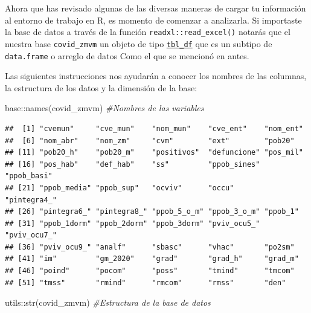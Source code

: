 \documentclass[
  11pt,
  oneside]{book}
\newenvironment{Shaded}{\begin{snugshade}}{\end{snugshade}}
\newcommand{\CommentTok}[1]{\textcolor[rgb]{0.56,0.35,0.01}{\textit{#1}}}
\newcommand{\FunctionTok}[1]{\textcolor[rgb]{0.00,0.00,0.00}{#1}}
\newcommand{\NormalTok}[1]{#1}
\newcommand{\SpecialCharTok}[1]{\textcolor[rgb]{0.00,0.00,0.00}{#1}}
\begin{document}
Ahora que has revisado algunas de las diversas maneras de cargar tu información al entorno de trabajo en R, es momento de comenzar a analizarla. Si importaste la base de datos a través de la función \texttt{readxl::read\_excel()} notarás que el nuestra base \texttt{covid\_zmvm} un objeto de tipo \href{https://tibble.tidyverse.org/reference/tbl_df-class.html}{\texttt{tbl\_df}} que es un subtipo de \texttt{data.frame} o arreglo de datos Como el que se mencionó en antes.

Las siguientes instrucciones nos ayudarán a conocer los nombres de las columnas, la estructura de los datos y la dimensión de la base:

\begin{Shaded}
\begin{Highlighting}[]
\NormalTok{base}\SpecialCharTok{::}\FunctionTok{names}\NormalTok{(covid\_zmvm) }\CommentTok{\#Nombres de las variables}
\end{Highlighting}
\end{Shaded}

\begin{verbatim}
##  [1] "cvemun"     "cve_mun"    "nom_mun"    "cve_ent"    "nom_ent"   
##  [6] "nom_abr"    "nom_zm"     "cvm"        "ext"        "pob20"     
## [11] "pob20_h"    "pob20_m"    "positivos"  "defuncione" "pos_mil"   
## [16] "pos_hab"    "def_hab"    "ss"         "ppob_sines" "ppob_basi" 
## [21] "ppob_media" "ppob_sup"   "ocviv"      "occu"       "pintegra4_"
## [26] "pintegra6_" "pintegra8_" "ppob_5_o_m" "ppob_3_o_m" "ppob_1"    
## [31] "ppob_1dorm" "ppob_2dorm" "ppob_3dorm" "pviv_ocu5_" "pviv_ocu7_"
## [36] "pviv_ocu9_" "analf"      "sbasc"      "vhac"       "po2sm"     
## [41] "im"         "gm_2020"    "grad"       "grad_h"     "grad_m"    
## [46] "poind"      "pocom"      "poss"       "tmind"      "tmcom"     
## [51] "tmss"       "rmind"      "rmcom"      "rmss"       "den"
\end{verbatim}

\begin{Shaded}
\begin{Highlighting}[]
\NormalTok{utils}\SpecialCharTok{::}\FunctionTok{str}\NormalTok{(covid\_zmvm) }\CommentTok{\#Estructura de la base de datos}
\end{Highlighting}
\end{Shaded}
\end{document}
